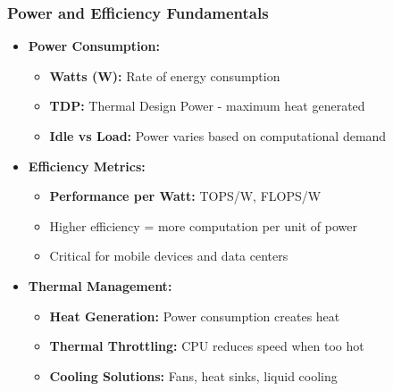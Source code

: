 \begin{frame}
\frametitle{Power and Efficiency Fundamentals}
\begin{itemize}
    \item \textbf{Power Consumption:}
    \begin{itemize}
        \item \textbf{Watts (W):} Rate of energy consumption
        \item \textbf{TDP:} Thermal Design Power - maximum heat generated
        \item \textbf{Idle vs Load:} Power varies based on computational demand
    \end{itemize}
    \item \textbf{Efficiency Metrics:}
    \begin{itemize}
        \item \textbf{Performance per Watt:} TOPS/W, FLOPS/W
        \item Higher efficiency = more computation per unit of power
        \item Critical for mobile devices and data centers
    \end{itemize}
    \item \textbf{Thermal Management:}
    \begin{itemize}
        \item \textbf{Heat Generation:} Power consumption creates heat
        \item \textbf{Thermal Throttling:} CPU reduces speed when too hot
        \item \textbf{Cooling Solutions:} Fans, heat sinks, liquid cooling
    \end{itemize}
\end{itemize}
\end{frame}

